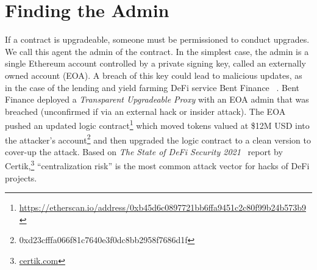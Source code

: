 
\section{Finding the Admin}
\label{sec:governance}

If a contract is upgradeable, someone must be permissioned to conduct upgrades. We call this agent the admin of the contract. In the simplest case, the admin is a single Ethereum account controlled by a private signing key, called an externally owned account (EOA). A breach of this key could lead to malicious updates, as in the case of the lending and yield farming DeFi service Bent Finance ~\cite{bentFinanceHack}. Bent Finance deployed a \textit{Transparent Upgradeable Proxy} with an EOA admin that was breached (unconfirmed if via an external hack or insider attack). The EOA pushed an updated logic contract\footnote{\url{https://etherscan.io/address/0xb45d6c0897721bb6ffa9451c2c80f99b24b573b9}}  which moved tokens valued at \$12M USD into the attacker's account\footnote{0xd23cfffa066f81c7640e3f0dc8bb2958f7686d1f} and then upgraded the logic contract to a clean version to cover-up the attack. Based on \textit{The State of DeFi Security 2021}~\cite{certikReport} report by Certik,\footnote{\url{certik.com}} ``centralization risk'' is the most common attack vector for hacks of DeFi projects. 
 



